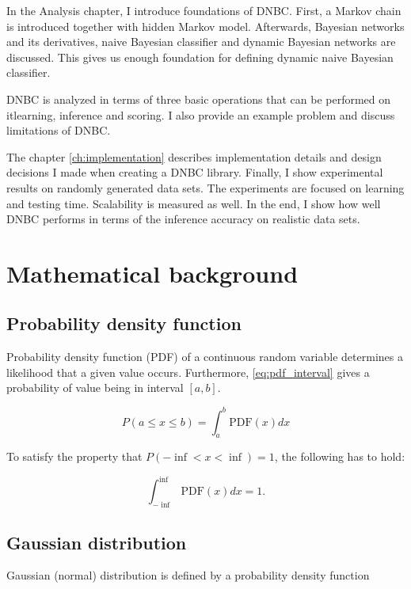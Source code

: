 \documentclass[thesis=B,english]{FITthesis}[2012/06/26]
\begin{document}
\begin{introduction}
In the Analysis chapter, I introduce foundations of DNBC. First, a Markov chain is introduced together with hidden Markov model. Afterwards, Bayesian networks and its derivatives, naive Bayesian classifier and dynamic Bayesian networks are discussed. This gives us enough foundation for defining dynamic naive Bayesian classifier.

DNBC is analyzed in terms of three basic operations that can be performed on it\textemdash learning, inference and scoring. I also provide an example problem and discuss limitations of DNBC.

The chapter \ref{ch:implementation} describes implementation details and design decisions I made when creating a DNBC library. Finally, I show experimental results on randomly generated data sets. The experiments are focused on learning and testing time. Scalability is measured as well. In the end, I show how well DNBC performs in terms of the inference accuracy on realistic data sets.
\end{introduction}

\chapter{Mathematical background}

\section{Probability density function}

Probability density function (PDF) of a continuous random variable determines a likelihood that a given value occurs. Furthermore, \ref{eq:pdf_interval} gives a probability of value being in interval $[a,b]$.

\begin{equation} \label{eq:pdf_interval}
P(a \leq x \leq b) = \int_a^b \text{PDF}(x) dx
\end{equation}

To satisfy the property that $P(-\inf < x < \inf) = 1$, the following has to hold:

\begin{equation}
\int_{-\inf}^{\inf} \text{PDF}(x) dx = 1.
\end{equation}

\section{Gaussian distribution}

Gaussian (normal) distribution is defined by a probability density function
\end{document}
